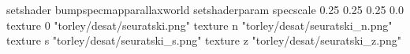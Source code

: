 setshader bumpspecmapparallaxworld
setshaderparam specscale 0.25 0.25 0.25 0.0
texture 0 "torley/desat/seuratski.png"
texture n "torley/desat/seuratski_n.png"
texture s "torley/desat/seuratski_s.png"
texture z "torley/desat/seuratski_z.png"

